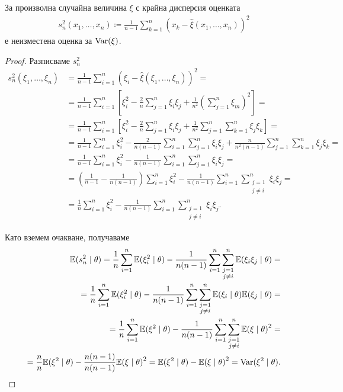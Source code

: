 \documentclass[numbers=endperiod, bibliography=totocnumbered]{scrartcl}
\begin{document}
\begin{proposition}\label{thm:unbiased-variation}
  За произволна случайна величина \( \xi \) с крайна дисперсия оценката
  \begin{align*}
    s_n^2(x_1, \ldots, x_n) \coloneqq \frac 1 {n-1} \sum_{k=1}^n {(x_k - \hat \xi(x_1, \ldots, x_n))}^2
  \end{align*}
  е неизместена оценка за \( \operatorname{Var}(\xi) \).
\end{proposition}
\begin{proof}
  Разписваме \( s_n^2 \)
  \begingroup
  \allowdisplaybreaks
  \begin{align*}
    s_n^2(\xi_1, \ldots, \xi_n)
    &=
    \frac 1 {n-1} \sum_{i=1}^n {(\xi_i - \hat \xi(\xi_1, \ldots, \xi_n))}^2
    = \\ &=
    \frac 1 {n-1} \sum_{i=1}^n \left[\xi_i^2 - \frac 2 n \sum_{j=1}^n \xi_i \xi_j + \frac 1 {n^2} {\left( \sum_{j=1}^n \xi_m \right)}^2 \right]
    = \\ &=
    \frac 1 {n-1} \sum_{i=1}^n \left[\xi_i^2 - \frac 2 n \sum_{j=1}^n \xi_i \xi_j + \frac 1 {n^2} \sum_{j=1}^n \sum_{k=1}^n \xi_j \xi_k \right]
    = \\ &=
    \frac 1 {n-1} \sum_{i=1}^n \xi_i^2 - \frac 2 {n(n-1)} \sum_{i=1}^n \sum_{j=1}^n \xi_i \xi_j + \frac n {n^2 (n-1)} \sum_{j=1}^n \sum_{k=1}^n \xi_j \xi_k
    = \\ &=
    \frac 1 {n-1} \sum_{i=1}^n \xi_i^2 - \frac 1 {n(n-1)} \sum_{i=1}^n \sum_{j=1}^n \xi_i \xi_j
    = \\ &=
    \left(\frac 1 {n-1} - \frac 1 {n(n-1)} \right) \sum_{i=1}^n \xi_i^2 - \frac 1 {n(n-1)} \sum_{i=1}^n \sum_{\substack{j=1 \\ j\neq i}}^n \xi_i \xi_j
    = \\ &=
    \frac 1 n \sum_{i=1}^n \xi_i^2 - \frac 1 {n(n-1)} \sum_{i=1}^n \sum_{\substack{j=1 \\ j\neq i}}^n \xi_i \xi_j.
  \end{align*}
  \endgroup

  Като вземем очакване, получаваме
  \begin{align*}
    \mathbb{E}(s_n^2 \mid \theta)
    =
    \frac 1 n \sum_{i=1}^n \mathbb{E}(\xi_i^2 \mid \theta) - \frac 1 {n(n-1)} \sum_{i=1}^n \sum_{\substack{j=1 \\ j\neq i}}^n \mathbb{E}(\xi_i \xi_j \mid \theta)
    = \\ =
    \frac 1 n \sum_{i=1}^n \mathbb{E}(\xi_i^2 \mid \theta) - \frac 1 {n(n-1)} \sum_{i=1}^n \sum_{\substack{j=1 \\ j\neq i}}^n \mathbb{E}(\xi_i \mid \theta) \mathbb{E}(\xi_j \mid \theta)
    = \\ =
    \frac 1 n \sum_{i=1}^n \mathbb{E}(\xi^2 \mid \theta) - \frac 1 {n(n-1)} \sum_{i=1}^n \sum_{\substack{j=1 \\ j\neq i}}^n {\mathbb{E}(\xi \mid \theta)}^2
    = \\ =
    \frac n n \mathbb{E}(\xi^2 \mid \theta) - \frac {n(n-1)} {n(n-1)} {\mathbb{E}(\xi \mid \theta)}^2
    =
    \mathbb{E}(\xi^2 \mid \theta) - {\mathbb{E}(\xi \mid \theta)}^2
    =
    \operatorname{Var}(\xi^2 \mid \theta).
  \end{align*}
\end{proof}
\end{document}
